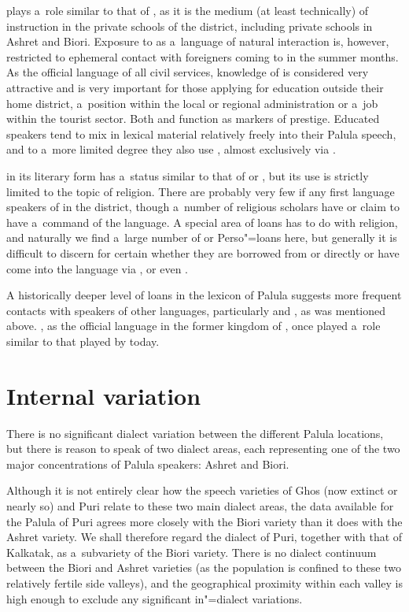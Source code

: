 \iliEnglish plays a~role similar to that of \iliUrdu, as it is the medium (at least technically) of instruction in the private schools of the district, including private schools in Ashret and Biori. Exposure to \iliEnglish as a~language of natural interaction is, however, restricted to ephemeral contact with foreigners coming to \iliChitral in the summer months. As the official language of all civil services, knowledge of \iliEnglish is considered very attractive and is very important for those applying for education outside their home district, a~position within the local or regional administration or a~job within the tourist sector. Both \iliUrdu and \iliEnglish function as markers of prestige. Educated speakers tend to mix in \iliUrdu lexical material relatively freely into their Palula speech, and to a~more limited degree they also use \iliEnglish, almost exclusively via \iliUrdu. 


\iliArabic in its literary form has a~status similar to that of \iliUrdu or \iliEnglish, but its use is strictly limited to the topic of religion. There are probably very few if any first language speakers of \iliArabic in the district, though a~number of religious scholars have or claim to have a~command of the language. A special area of loans has to do with religion, and naturally we find a~large number of \iliArabic or Perso"=\iliArabic loans here, but generally it is difficult to discern for certain whether they are borrowed from \iliArabic or \iliPersian directly or have come into the language via \iliPashto, \iliUrdu or even \iliKhowar.


A historically deeper level of loans in the lexicon of Palula suggests more frequent contacts with speakers of other languages, particularly \iliDameli and \iliKalasha, as was mentioned above. \iliPersian, as the official language in the former kingdom of \iliChitral, once played a~role similar to that played by \iliUrdu today. 


\section{Internal variation}
\label{sec:1-4}
\largerpage
There is no significant dialect variation between the different Palula locations, but there is reason to speak of two dialect areas, each representing one of the two major concentrations of Palula speakers: Ashret and Biori. 


Although it is not entirely clear how the speech varieties of Ghos (now extinct or nearly so) and Puri relate to these two main dialect areas, the data available for the Palula of Puri agrees more closely with the Biori variety than it does with the Ashret variety. We shall therefore regard the dialect of Puri, together with that of Kalkatak, as a~subvariety of the Biori variety. There is no dialect continuum between the Biori and Ashret varieties (as the population is confined to these two relatively fertile side valleys), and the geographical proximity within each valley is high enough to exclude any significant in"=dialect variations. 



